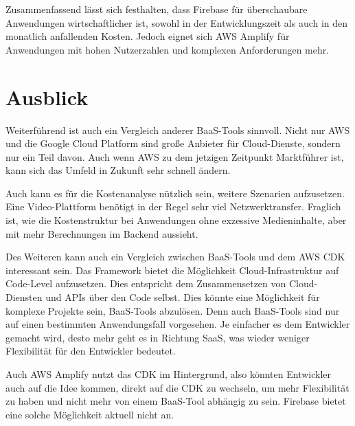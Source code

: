 Zusammenfassend lässt sich festhalten, dass Firebase für überschaubare Anwendungen wirtschaftlicher ist, sowohl in der Entwicklungszeit als auch in den monatlich anfallenden Kosten. Jedoch eignet sich \ac{AWS} Amplify für Anwendungen mit hohen Nutzerzahlen und komplexen Anforderungen mehr.

\chapter{Ausblick}

Weiterführend ist auch ein Vergleich anderer \ac{BaaS}-Tools sinnvoll. Nicht nur \ac{AWS} und die Google Cloud Platform sind große Anbieter für Cloud-Dienste, sondern nur ein Teil davon. Auch wenn \ac{AWS} zu dem jetzigen Zeitpunkt Marktführer ist, kann sich das Umfeld in Zukunft sehr schnell ändern.

Auch kann es für die Kostenanalyse nützlich sein, weitere Szenarien aufzusetzen. Eine Video-Plattform benötigt in der Regel sehr viel Netzwerktransfer. Fraglich ist, wie die Kostenstruktur bei Anwendungen ohne exzessive Medieninhalte, aber mit mehr Berechnungen im Backend aussieht.

Des Weiteren kann auch ein Vergleich zwischen \ac{BaaS}-Tools und dem \ac{AWS} \ac{CDK} interessant sein. Das Framework bietet die Möglichkeit Cloud-Infrastruktur auf Code-Level aufzusetzen.  Dies entspricht dem Zusammensetzen von Cloud-Diensten und \ac{API}s über den Code selbst. Dies könnte eine Möglichkeit für komplexe Projekte sein, \ac{BaaS}-Tools abzulösen. Denn auch \ac{BaaS}-Tools sind nur auf einen bestimmten Anwendungsfall vorgesehen. Je einfacher es dem Entwickler gemacht wird, desto mehr geht es in Richtung \ac{SaaS}, was wieder weniger Flexibilität für den Entwickler bedeutet.

Auch \ac{AWS} Amplify nutzt das \ac{CDK} im Hintergrund, also könnten Entwickler auch auf die Idee kommen, direkt auf die \ac{CDK} zu wechseln, um mehr Flexibilität zu haben und nicht mehr von einem \ac{BaaS}-Tool abhängig zu sein. Firebase bietet  eine solche Möglichkeit aktuell nicht an.